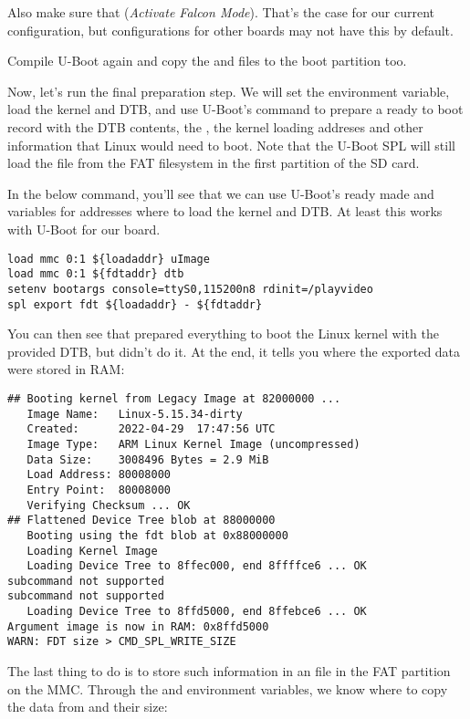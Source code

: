 Also make sure that 
({\em Activate Falcon Mode}).
That's the case for our current configuration, but configurations
for other boards may not have this by default.

Compile U-Boot again
and copy the  and  files to the boot
partition too.

Now, let's run the final preparation step. We will set the
 environment variable, load the kernel and DTB, and
use U-Boot's  command to prepare a ready to boot record
with the DTB contents, the , the kernel loading addreses
and other information that Linux would need to boot. Note that the
U-Boot SPL will still load the  file from the FAT
filesystem in the first partition of the SD card.

In the below command, you'll see that we can use U-Boot's ready made
 and  variables for addresses where to load
the kernel and DTB. At least this works with U-Boot for our board.

\begin{verbatim}
load mmc 0:1 ${loadaddr} uImage
load mmc 0:1 ${fdtaddr} dtb
setenv bootargs console=ttyS0,115200n8 rdinit=/playvideo
spl export fdt ${loadaddr} - ${fdtaddr}
\end{verbatim}

You can then see that  prepared everything to boot the
Linux kernel with the provided DTB, but didn't do it. At the end, it
tells you where the exported data were stored in RAM:

\begin{verbatim}
## Booting kernel from Legacy Image at 82000000 ...
   Image Name:   Linux-5.15.34-dirty
   Created:      2022-04-29  17:47:56 UTC
   Image Type:   ARM Linux Kernel Image (uncompressed)
   Data Size:    3008496 Bytes = 2.9 MiB
   Load Address: 80008000
   Entry Point:  80008000
   Verifying Checksum ... OK
## Flattened Device Tree blob at 88000000
   Booting using the fdt blob at 0x88000000
   Loading Kernel Image
   Loading Device Tree to 8ffec000, end 8ffffce6 ... OK
subcommand not supported
subcommand not supported
   Loading Device Tree to 8ffd5000, end 8ffebce6 ... OK
Argument image is now in RAM: 0x8ffd5000
WARN: FDT size > CMD_SPL_WRITE_SIZE
\end{verbatim}

The last thing to do is to store such information in an  file
in the FAT partition on the MMC. Through the  and
 environment variables, we know where to copy the
data from and their size:

